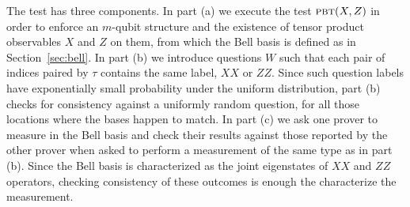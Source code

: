 The test has three components. In part (a) we execute the test $\textsc{pbt}(X,Z)$ in order to enforce an $m$-qubit structure and the existence of tensor product observables $X$ and $Z$ on them, from which the Bell basis is defined as in Section~\ref{sec:bell}. In part (b) we introduce questions $W$ such that each pair of indices paired by $\tau$ contains the same label, $XX$ or $ZZ$. Since such question labels have exponentially small probability under the uniform distribution, part (b) checks for consistency against a uniformly random question, for all those locations where the bases happen to match. 
In part (c) we ask one prover to measure in the Bell basis and check their results against those reported by the other prover when asked to perform a measurement of the same type as in part (b). Since the Bell basis is characterized as the joint eigenstates of $XX$ and $ZZ$ operators, checking consistency of these outcomes is enough the characterize the measurement. 


